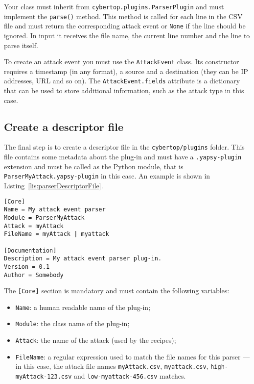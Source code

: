 \documentclass{scrartcl}
\begin{document}
Your class must inherit from \lstinline|cybertop.plugins.ParserPlugin| and must implement the \lstinline|parse()| method. This method is called for each line in the CSV file and must return the corresponding attack event or \lstinline|None| if the line should be ignored. In input it receives the file name, the current line number and the line to parse itself.

To create an attack event you must use the \lstinline|AttackEvent| class. Its constructor requires a timestamp (in any format), a source and a destination (they can be IP addresses, URL and so on). The \lstinline|AttackEvent.fields| attribute is a dictionary that can be used to store additional information, such as the attack type in this case.

\subsection{Create a descriptor file}

The final step is to create a descriptor file in the \lstinline|cybertop/plugins| folder. This file contains some metadata about the plug-in and must have a \lstinline|.yapsy-plugin| extension and must be called as the Python module, that is \lstinline|ParserMyAttack.yapsy-plugin| in this case. An example is shown in Listing~\ref{lis:parserDescriptorFile}.

\begin{lstlisting}[caption = Example of an attack parser descriptor., label = lis:parserDescriptorFile]
[Core]
Name = My attack event parser
Module = ParserMyAttack
Attack = myAttack
FileName = myAttack | myattack

[Documentation]
Description = My attack event parser plug-in.
Version = 0.1
Author = Somebody
\end{lstlisting}

The \lstinline|[Core]| section is mandatory and must contain the following variables:

\begin{itemize}
	\item \lstinline|Name|: a human readable name of the plug-in;
	\item \lstinline|Module|: the class name of the plug-in;
	\item \lstinline|Attack|: the name of the attack (used by the recipes);
	\item \lstinline|FileName|: a regular expression used to match the file names for this parser --- in this case, the attack file names \lstinline|myAttack.csv|, \lstinline|myattack.csv|, \lstinline|high-myAttack-123.csv| and \lstinline|low-myattack-456.csv| matches.
\end{itemize}
\end{document}
